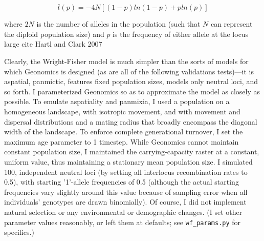 ﻿\documentclass{article}
\begin{document}
\begin{equation}
\bar{t}(p) = -4N[(1 - p)ln(1 - p) + pln(p)]
\end{equation}

where $2N$ is the number of alleles in the population (such that $N$ can
represent the diploid population size) and $p$ is the frequency of either allele
at the locus {large cite Hartl and Clark 2007}

Clearly, the Wright-Fisher model is much simpler than the sorts of models for which
Geonomics is designed (as are all of the following validations tests)---it is aspatial,
panmictic, features fixed population sizes, models only neutral loci, and so forth. 
I parameterized Geonomics so as to approximate the model as closely as possible.
To emulate aspatiality and panmixia, I used a population on a homogeneous landscape,
with isotropic movement, and with movement and dispersal distributions
and a mating radius that broadly encompass the diagonal width of the landscape.
To enforce complete generational turnover, I set the
maximum age parameter to 1 timestep. While Geonomics cannot maintain constant population
size, I maintained the carrying-capacity raster at a constant, uniform value, thus
maintaining a stationary mean population size. I simulated 100, independent neutral
loci (by setting all interlocus recombination rates to 0.5), with starting '1'-allele
frequencies of 0.5 (although the actual starting frequencies vary slightly around
this value because of sampling error when all individuals' genotypes are drawn binomially).
Of course, I did not implement natural selection or any environmental
or demographic changes.
(I set other parameter values reasonably, or left them at defaults;
see \texttt{wf\_params.py} for specifics.)
\end{document}
